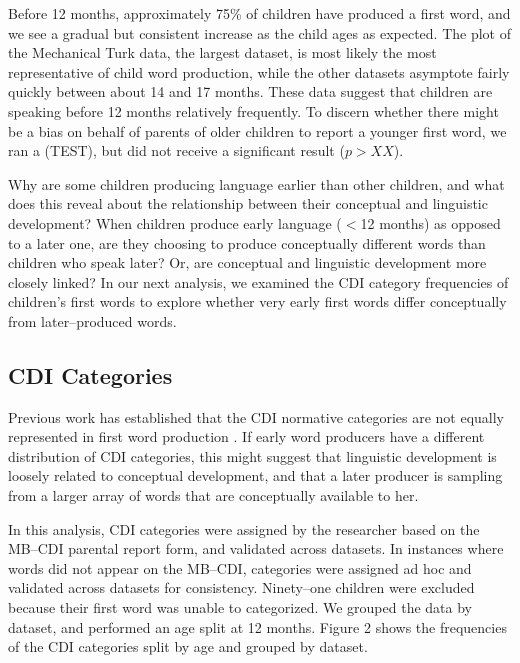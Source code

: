 \documentclass[10pt,letterpaper]{article}
\begin{document}
Before 12 months, approximately 75\% of children have produced a first word, and we see a gradual but consistent increase as the child ages as expected. The plot of the Mechanical Turk data, the largest dataset, is most likely the most representative of child word production, while the other datasets asymptote fairly quickly between about 14 and 17 months. 
These data suggest that children are speaking before 12 months relatively frequently. To discern whether there might be a bias on behalf of parents of older children to report a younger first word, we ran a (TEST), but did not receive a significant result ($p > XX$).

Why are some children producing language earlier than other children, and what does this reveal about the relationship between their conceptual and linguistic development? When children produce early language ($<$12 months) as opposed to a later one, are they choosing to produce conceptually different words than children who speak later? Or, are conceptual and linguistic development more closely linked? In our next analysis, we examined the CDI category frequencies of children's first words to explore whether very early first words differ conceptually from later--produced words. 

\subsection{CDI Categories} 
Previous work has established that the CDI normative categories are not equally represented in first word production \cite{fenson1994}. If early word producers have a different distribution of CDI categories, this might suggest that linguistic development is loosely related to conceptual development, and that a later producer is sampling from a larger array of words that are conceptually available to her.

In this analysis, CDI categories were assigned by the researcher based on the MB--CDI parental report form, and validated across datasets. In instances where words did not appear on the MB--CDI, categories were assigned ad hoc and validated across datasets for consistency. Ninety--one children were excluded because their first word was unable to categorized. We grouped the data by dataset, and performed an age split at 12 months. Figure 2 shows the frequencies of the CDI categories split by age and grouped by dataset.
\end{document}
